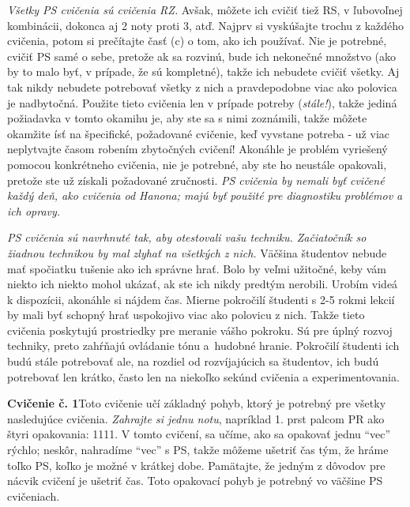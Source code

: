 \emph{Všetky PS cvičenia sú cvičenia RZ.} Avšak, môžete ich cvičiť tiež RS, v ľubovoľnej kombinácii, dokonca aj 2 noty proti 3, atď. Najprv si vyskúšajte trochu z každého cvičenia, potom si prečítajte časť (c) o tom, ako ich používať. Nie je potrebné, cvičiť PS samé o sebe, pretože ak sa rozvinú, bude ich  nekonečné množstvo (ako by to malo byť, v prípade, že sú kompletné), takže ich nebudete cvičiť všetky. Aj tak nikdy nebudete potrebovať všetky z nich a pravdepodobne viac ako polovica je nadbytočná. Použite tieto cvičenia len v prípade potreby (\textit{stále!}), takže jediná požiadavka v tomto okamihu je, aby ste sa s nimi zoznámili, takže môžete okamžite ísť na špecifické, požadované cvičenie, keď vyvstane potreba - už viac neplytvajte časom robením zbytočných cvičení! Akonáhle je problém vyriešený pomocou konkrétneho cvičenia, nie je potrebné, aby ste ho neustále opakovali, pretože ste už získali požadované zručnosti. \emph{PS cvičenia by nemali byť cvičené každý deň, ako cvičenia od Hanona; majú byť použité pre diagnostiku problémov a ich opravy.}

\emph{PS cvičenia sú navrhnuté tak, aby otestovali vašu techniku. Začiatočník so žiadnou technikou by mal zlyhať na všetkých z nich.} Väčšina študentov nebude mať spočiatku tušenie ako ich správne hrať. Bolo by veľmi užitočné, keby vám niekto ich niekto mohol ukázať, ak ste ich nikdy predtým nerobili. Urobím videá k dispozícii, akonáhle si nájdem čas. Mierne pokročilí študenti s 2-5 rokmi lekcií by mali byť schopný hrať uspokojivo viac ako polovicu z nich. Takže tieto cvičenia poskytujú prostriedky pre meranie vášho pokroku. Sú pre úplný rozvoj techniky, preto zahŕňajú ovládanie tónu a~hudobné hranie. Pokročilí študenti ich budú stále potrebovať ale, na rozdiel od rozvíjajúcich sa študentov, ich budú potrebovať len krátko, často len na niekoľko sekúnd cvičenia a experimentovania.

\textbf{Cvičenie č. 1}\enspace Toto cvičenie učí základný pohyb, ktorý je potrebný pre všetky nasledujúce cvičenia. \emph{Zahrajte si jednu notu}, napríklad 1. prst palcom PR ako štyri opakovania: 1111. V tomto cvičení, sa učíme, ako sa opakovať jednu “vec” rýchlo; neskôr, nahradíme “vec” s PS, takže môžeme ušetriť čas tým, že hráme toľko PS, koľko je možné v krátkej dobe. Pamätajte, že jedným z dôvodov pre nácvik cvičení je ušetriť čas. Toto opakovací pohyb je potrebný vo väčšine PS cvičeniach.


